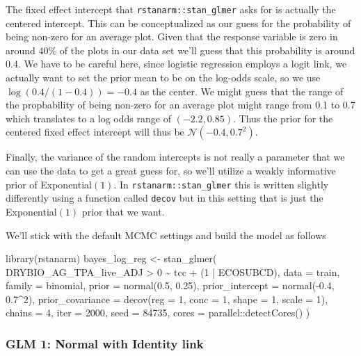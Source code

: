 \documentclass[12pt,twoside]{reedthesis}
\newenvironment{Shaded}{\begin{snugshade}}{\end{snugshade}}
\newcommand{\AttributeTok}[1]{\textcolor[rgb]{0.77,0.63,0.00}{#1}}
\newcommand{\DecValTok}[1]{\textcolor[rgb]{0.00,0.00,0.81}{#1}}
\newcommand{\FloatTok}[1]{\textcolor[rgb]{0.00,0.00,0.81}{#1}}
\newcommand{\FunctionTok}[1]{\textcolor[rgb]{0.00,0.00,0.00}{#1}}
\newcommand{\NormalTok}[1]{#1}
\newcommand{\OtherTok}[1]{\textcolor[rgb]{0.56,0.35,0.01}{#1}}
\newcommand{\SpecialCharTok}[1]{\textcolor[rgb]{0.00,0.00,0.00}{#1}}
\begin{document}
The fixed effect intercept that \texttt{rstanarm::stan\_glmer} asks for is actually the centered intercept. This can be conceptualized as our guess for the probability of being non-zero for an average plot. Given that the response variable is zero in around 40\% of the plots in our data set we'll guess that this probability is around 0.4. We have to be careful here, since logistic regression employs a logit link, we actually want to set the prior mean to be on the log-odds scale, so we use \(\log{(0.4/(1-0.4))} = -0.4\) as the center. We might guess that the range of the propbability of being non-zero for an average plot might range from 0.1 to 0.7 which translates to a log odds range of \((-2.2, 0.85)\). Thus the prior for the centered fixed effect intercept will thus be \(\mathcal{N}(-0.4, 0.7^2)\).

Finally, the variance of the random intercepts is not really a parameter that we can use the data to get a great guess for, so we'll utilize a weakly informative prior of Exponential\((1)\). In \texttt{rstanarm::stan\_glmer} this is written slightly differently using a function called \texttt{decov} but in this setting that is just the Exponential\((1)\) prior that we want.

We'll stick with the default MCMC settings and build the model as follows
\begin{Shaded}
\begin{Highlighting}[]
\FunctionTok{library}\NormalTok{(rstanarm)}
\NormalTok{bayes\_log\_reg }\OtherTok{\textless{}{-}} \FunctionTok{stan\_glmer}\NormalTok{(}
\NormalTok{  DRYBIO\_AG\_TPA\_live\_ADJ }\SpecialCharTok{\textgreater{}} \DecValTok{0} \SpecialCharTok{\textasciitilde{}}\NormalTok{ tcc }\SpecialCharTok{+}\NormalTok{ (}\DecValTok{1} \SpecialCharTok{|}\NormalTok{ ECOSUBCD),}
  \AttributeTok{data =}\NormalTok{ train,}
  \AttributeTok{family =}\NormalTok{ binomial,}
  \AttributeTok{prior =} \FunctionTok{normal}\NormalTok{(}\FloatTok{0.5}\NormalTok{, }\FloatTok{0.25}\NormalTok{),}
  \AttributeTok{prior\_intercept =} \FunctionTok{normal}\NormalTok{(}\SpecialCharTok{{-}}\FloatTok{0.4}\NormalTok{, }\FloatTok{0.7}\SpecialCharTok{\^{}}\DecValTok{2}\NormalTok{),}
  \AttributeTok{prior\_covariance =} \FunctionTok{decov}\NormalTok{(}\AttributeTok{reg =} \DecValTok{1}\NormalTok{, }\AttributeTok{conc =} \DecValTok{1}\NormalTok{, }\AttributeTok{shape =} \DecValTok{1}\NormalTok{, }\AttributeTok{scale =} \DecValTok{1}\NormalTok{),}
  \AttributeTok{chains =} \DecValTok{4}\NormalTok{, }\AttributeTok{iter =} \DecValTok{2000}\NormalTok{, }\AttributeTok{seed =} \DecValTok{84735}\NormalTok{,}
  \AttributeTok{cores =}\NormalTok{ parallel}\SpecialCharTok{::}\FunctionTok{detectCores}\NormalTok{()}
\NormalTok{)}
\end{Highlighting}
\end{Shaded}
\hypertarget{glm-1-normal-with-identity-link}{%
\subsubsection{GLM 1: Normal with Identity link}\label{glm-1-normal-with-identity-link}}
\end{document}
